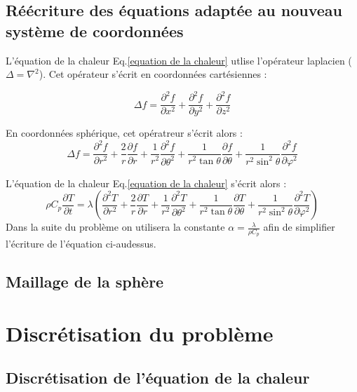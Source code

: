 \documentclass[fleqn]{article}
\begin{document}
\subsection{Réécriture des équations adaptée au nouveau système de coordonnées}
 
L'équation de la chaleur Eq.\eqref{equation de la chaleur} utlise l'opérateur laplacien ($\Delta = \nabla^2$). Cet opérateur s'écrit en coordonnées cartésiennes :

\begin{equation}
    \Delta f = {\frac {\partial ^{2}f }{\partial x^{2}}}+{\frac {\partial ^{2}f }{\partial y^{2}}}+{\frac {\partial ^{2}f }{\partial z^{2}}}
\end{equation}

En coordonnées sphérique, cet opératreur s'écrit alors :
\begin{equation}
     \Delta f={\frac {\partial ^{2}f}{\partial r^{2}}}+{\frac {2}{r}}{\frac {\partial f}{\partial r}}+{\frac {1}{r^{2}}}{\frac {\partial ^{2}f}{\partial \theta ^{2}}}+{\frac {1}{r^{2}\tan \theta }}{\frac {\partial f}{\partial \theta }}+{\frac {1}{r^{2}\sin ^{2}\theta }}{\frac {\partial ^{2}f}{\partial \varphi ^{2}}}
\end{equation}

L'équation de la chaleur Eq.\eqref{equation de la chaleur} s'écrit alors :
\begin{equation}
    \rho C_p \frac{ \partial T}{\partial t}  = \lambda \left( 
    {\frac {\partial ^{2}T}{\partial r^{2}}}+{\frac {2}{r}}{\frac {\partial T}{\partial r}}+{\frac {1}{r^{2}}}{\frac {\partial ^{2}T}{\partial \theta ^{2}}}+{\frac {1}{r^{2}\tan \theta }}{\frac {\partial T}{\partial \theta }}+{\frac {1}{r^{2}\sin ^{2}\theta }}{\frac {\partial ^{2}T}{\partial \varphi ^{2}}} \right)      
\end{equation}
Dans la suite du problème on utilisera la constante $\alpha = \frac{\lambda}{\rho C_p}$ afin de simplifier l'écriture de l'équation ci-audessus.

\subsection{Maillage de la sphère}

\section{Discrétisation du problème} 
\subsection{Discrétisation de l'équation de la chaleur}
\end{document}
